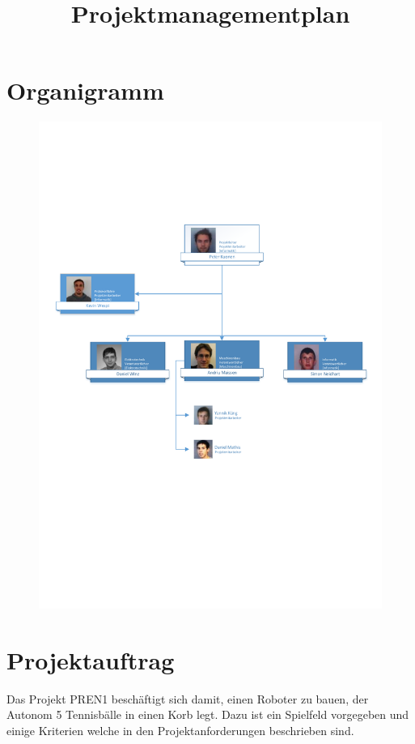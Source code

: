 \documentclass[a4paper,10pt,fleqn]{article}
\title{Projektmanagementplan}
\begin{document}

\clearpage
\tableofcontents
\clearpage

\newcommand{\tabheader}     %
{
    \begin{zebratabular}[l]{@{}p{0.2\linewidth}p{0.3\linewidth}p{0.3\linewidth}p{0.06\linewidth}@{}}
    \rowcolor{gray}
    Stichwort &
        Quelle &
        Beschreibung &
        Bew. \\
}



	\section{Organigramm}
	\begin{figure}[hb]
		\centering
		\includegraphics[width=4.5in]{pdf/organigramm.pdf}
	\end{figure}

	\section{Projektauftrag}
	Das Projekt PREN1 beschäftigt sich damit, einen Roboter zu bauen, der Autonom 5 Tennisbälle in einen Korb legt. Dazu ist ein Spielfeld vorgegeben und einige Kriterien welche in den Projektanforderungen beschrieben sind.
		
\end{document}
